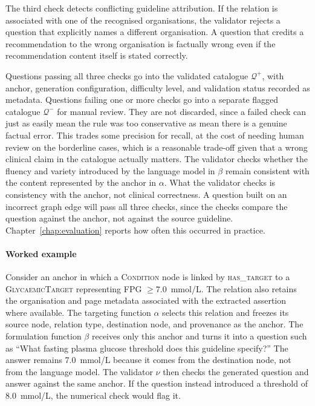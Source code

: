 The third check detects conflicting guideline attribution. If the relation is associated with one of the recognised organisations, the validator rejects a question that explicitly names a different organisation. A question that credits a recommendation to the wrong organisation is factually wrong even if the recommendation content itself is stated correctly.

Questions passing all three checks go into the validated catalogue $\mathcal{Q}^+$, with anchor, generation configuration, difficulty level, and validation status recorded as metadata. Questions failing one or more checks go into a separate flagged catalogue $\mathcal{Q}^-$ for manual review. They are not discarded, since a failed check can just as easily mean the rule was too conservative as mean there is a genuine factual error. This trades some precision for recall, at the cost of needing human review on the borderline cases, which is a reasonable trade-off given that a wrong clinical claim in the catalogue actually matters. The validator checks whether the fluency and variety introduced by the language model in $\beta$ remain consistent with the content represented by the anchor in $\alpha$. What the validator checks is consistency with the anchor, not clinical correctness. A question built on an incorrect graph edge will pass all three checks, since the checks compare the question against the anchor, not against the source guideline. Chapter~\ref{chap:evaluation} reports how often this occurred in practice.

\paragraph{Worked example}
Consider an anchor in which a \textsc{Condition} node is linked by \textsc{has\_target} to a \textsc{GlycaemicTarget} representing FPG $\geq 7.0$~mmol/L. The relation also retains the organisation and page metadata associated with the extracted assertion where available. The targeting function $\alpha$ selects this relation and freezes its source node, relation type, destination node, and provenance as the anchor. The formulation function $\beta$
receives only this anchor and turns it into a question such as
``What fasting plasma glucose threshold does this guideline specify?''
The answer remains 7.0~mmol/L because it comes from the destination node,
not from the language model. The validator $\nu$ then checks the generated
question and answer against the same anchor. If the question instead
introduced a threshold of 8.0~mmol/L, the numerical check would flag it.


